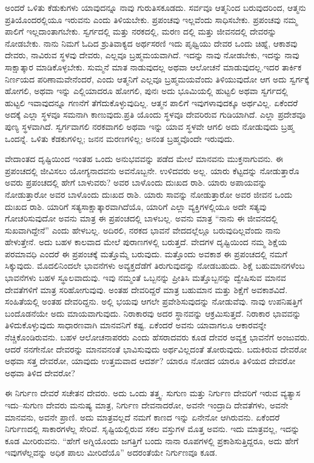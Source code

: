 ಅಂದರೆ ಒಳಿತು ಕೆಡುಕುಗಳು ಯಾವುದನ್ನೂ ನಾವು ಗುರುತಿಸಕೂಡದು. ಸರ್ವವೂ ಆತ್ಮನಿಂದ ಬರುವುದರಿಂದ, ಆತ್ಮನು ಪ್ರತಿಯೊಂದರಲ್ಲಿಯೂ ಇರುವನು ಎಂದು ತಿಳಿಯಬೇಕು. ಪ್ರಪಂಚವು ಇಲ್ಲವೆಂದು ಸಾಧಿಸಬೇಕು. ಪ್ರಪಂಚವು ನಮ್ಮ ಪಾಲಿಗೆ ಇಲ್ಲದಾಂತಾಗಬೇಕು. ಸ್ವರ್ಗದಲ್ಲಿ ಮತ್ತು ನರಕದಲ್ಲಿ, ಮರಣ ದಲ್ಲಿ ಮತ್ತು ಜೀವನದಲ್ಲಿ ದೇವರನ್ನು ನೋಡಬೇಕು. ನಾನು ನಿಮಗೆ ಓದಿದ ಶ್ರುತಿವಾಕ್ಯದ ಅರ್ಥಸರಣಿ ಇದು ಪೃಥ್ವಿಯು ದೇವರ ಒಂದು ಚಿಹ್ನೆ, ಆಕಾಶವು ದೇವರು, ನಾವಿರುವ ಸ್ಥಳವು ದೇವರು, ಎಲ್ಲವೂ ಬ್ರಹ್ಮಮಯವಾಗಿದೆ. ಇದನ್ನು ನಾವು ನೋಡಬೇಕು, ಇದನ್ನು ನಾವು ಸಾಕ್ಷಾತ್ಕಾರ ಮಾಡಿಕೊಳ್ಳಬೇಕು. ಸುಮ್ಮನೆ ಮಾತ ನಾಡುವುದಲ್ಲ ಅಥವಾ ಆಲೋಚನೆ ಮಾಡುವುದಲ್ಲ.ಇದರ ತಾರ್ಕಿಕ ನಿರ್ಣಯದ ಪರಿಣಾಮವೇನೆಂದರೆ, ಎಂದು ಆತ್ಮನಿಗೆ ಎಲ್ಲವೂ ಬ್ರಹ್ಮಮಯವೆಂದು ತಿಳಿಯುವುದೋ ಆಗ ಅದು ಸ್ವರ್ಗಕ್ಕೆ ಹೋಗಲಿ, ಅಥವಾ ಇನ್ನು ಎಲ್ಲಿಯಾದರೂ ಹೋಗಲಿ, ಪುನಃ ಅದು ಭೂಮಿಯಲ್ಲಿ ಹುಟ್ಟಲಿ ಅಥವಾ ಸ್ವರ್ಗದಲ್ಲಿ ಹುಟ್ಟಲಿ ಇವಾವುದನ್ನೂ ಗಣನೆಗೆ ತೆಗೆದುಕೊಳ್ಳುವುದಿಲ್ಲ. ಆತ್ಮನ ಪಾಲಿಗೆ ಇವುಗಳಾವುದಕ್ಕೂ ಅರ್ಥವಿಲ್ಲ. ಏಕೆಂದರೆ ಅದಕ್ಕೆ ಎಲ್ಲಾ ಸ್ಥಳವೂ ಸಮನಾಗಿ ಕಾಣುವುದು.ಪ್ರತಿ ಯೊಂದು ಸ್ಥಳವೂ ದೇವರಿರುವ ಗುಡಿಯಾಗಿದೆ. ಎಲ್ಲಾ ಪ್ರದೇಶವೂ ಪುಣ್ಯ ಸ್ಥಳವಾಗಿದೆ. ಸ್ವರ್ಗವಾಗಲಿ ನರಕವಾಗಲಿ ಅಥವಾ ಇನ್ನು ಯಾವ ಸ್ಥಳವೇ ಆಗಲಿ ಅದು ನೋಡುವುದು ಬ್ರಹ್ಮ ಒಂದನ್ನೆ. ಒಳಿತು ಕೆಡಕುಗಳಿಲ್ಲ; ಜನನ ಮರಣಗಳಿಲ್ಲ; ಅನಂತ ಬ್ರಹ್ಮವೊಂದೇ ಇರುವುದು.

ವೇದಾಂತದ ದೃಷ್ಟಿಯಿಂದ ಇಂತಹ ಒಂದು ಅನುಭವವನ್ನು ಪಡೆದ ಮೇಲೆ ಮಾನವನು ಮುಕ್ತನಾಗುವನು. ಈ ಪ್ರಪಂಚದಲ್ಲಿ ಜೀವಿಸಲು ಯೋಗ್ಯನಾದವನು ಅವನೊಬ್ಬನೇ. ಉಳಿದವರು ಅಲ್ಲ. ಯಾರು ಕೆಟ್ಟದನ್ನು ನೋಡುತ್ತಾರೊ ಅವರು ಪ್ರಪಂಚದಲ್ಲಿ ಹೇಗೆ ಬಾಳುವರು? ಅವರ ಬಾಳೊಂದು ದುಃಖದ ರಾಶಿ. ಯಾರು ಅಪಾಯವನ್ನು ನೋಡುತ್ತಾರೋ ಅವರ ಬಾಳೊಂದು ದುಃಖದ ರಾಶಿ. ಯಾರು ಸಾವನ್ನು ನೋಡುತ್ತಾರೋ ಅವರ ಜೀವನ ಒಂದು ದುಃಖದ ರಾಶಿ. ಯಾರಿಗೆ ಸತ್ಯಸಾಕ್ಷಾತ್ಕಾರವಾಗಿದೆಯೊ, ಯಾರಿಗೆ ಎಲ್ಲಾ ವ್ಯಕ್ತಿಗಳಲ್ಲಿಯೂ ಅದೇ ಸತ್ಯವು ಗೋಚರಿಸುವುದೋ ಅವನು ಮಾತ್ರ ಈ ಪ್ರಪಂಚದಲ್ಲಿ ಬಾಳಬಲ್ಲ. ಅವನು ಮಾತ್ರ “ನಾನು ಈ ಜೀವನದಲ್ಲಿ ಸುಖವಾಗಿದ್ದೇನೆ” ಎಂದು ಹೇಳಬಲ್ಲ. ಅದಿರಲಿ, ನರಕದ ಭಾವನೆ ವೇದದಲ್ಲೆಲ್ಲೂ ಬರುವುದಿಲ್ಲವೆಂದು ನಾನು ಹೇಳುತ್ತೇನೆ. ಅದು ಬಹಳ ಕಾಲವಾದ ಮೇಲೆ ಪುರಾಣಗಳಲ್ಲಿ ಬರುತ್ತದೆ. ವೇದಗಳ ದೃಷ್ಟಿಯಿಂದ ನಮ್ಮ ಶಿಕ್ಷೆಯ ಪರಮಾವಧಿ ಎಂದರೆ ಈ ಪ್ರಪಂಚಕ್ಕೆ ಮತ್ತೊಮ್ಮೆ ಬರುವುದು. ಮತ್ತೊಂದು ಅವಕಾಶ ಈ ಪ್ರಪಂಚದಲ್ಲಿ ನಮಗೆ ಸಿಕ್ಕುವುದು. ಮೊದಲಿನಿಂದಲೇ ಭಾವನೆಗಳು ಅವ್ಯಕ್ತದೆಡೆಗೆ ತಿರುಗುವುದನ್ನು ನೋಡಬಹುದು. ಶಿಕ್ಷೆ ಬಹುಮಾನಗಳೆಂಬ ಭಾವನೆಗಳು ಬಹಳ ಸ್ಥೂಲವಾದುವು. ಇವು ನಮ್ಮಂತೆ ಒಬ್ಬನನ್ನು ಪ್ರೀತಿಸಿ ಮತ್ತೊಬ್ಬನನ್ನು ದ್ವೇಷಿಸುವ ಮಾನವ ದೇವತೆಗಳಿಗೆ ಮಾತ್ರ ಸರಿಹೋಗುವುವು. ಅಂತಹ ದೇವರಿದ್ದರೆ ಮಾತ್ರ ಬಹುಮಾನ ಮತ್ತು ಶಿಕ್ಷೆಗೆ ಅವಕಾಶವಿದೆ. ಸಂಹಿತೆಯಲ್ಲಿ ಅಂತಹ ದೇವರಿದ್ದನು. ಅಲ್ಲಿ ಭಯವು ಆಗಲೇ ಪ್ರವೇಶಿಸುವುದನ್ನು ನೋಡುವೆವು. ನಾವು ಉಪನಿಷತ್ತಿಗೆ ಬಂದೊಡನೆಯೇ ಅದು ಮಾಯವಾಗುವುದು. ನಿರಾಕಾರವು ಅದರ ಸ್ಥಾನವನ್ನು ಆಕ್ರಮಿಸುತ್ತದೆ. ನಿರಾಕಾರ ಭಾವವನ್ನು ತಿಳಿದುಕೊಳ್ಳುವುದು ಸಾಧಾರಣವಾಗಿ ಮಾನವನಿಗೆ ಕಷ್ಟ. ಏಕೆಂದರೆ ಅವನು ಯಾವಾಗಲೂ ಆಕಾರವನ್ನೇ ನೆಚ್ಚಿಕೊಂಡಿರುವನು. ಬಹಳ ಆಲೋಚನಾಪರರು ಎಂದು ಹೆಸರಾದವರು ಕೂಡ ದೇವರ ಅವ್ಯಕ್ತ ಭಾವನೆಗೆ ಅಂಜುವರು. ಆದರೆ ನನಗೇನೋ ದೇವರನ್ನು ಮಾನವನಂತೆ ಭಾವಿಸುವುದು ಅರ್ಥವಿಲ್ಲದಂತೆ ತೋರುವುದು. ಬದುಕಿರುವ ದೇವರೋ ಅಥವಾ ಸತ್ತ ದೇವರೋ, ಯಾವುದು ಉತ್ತಮವಾದ ಆದರ್ಶ? ಯಾರೂ ನೋಡದ ಯಾರೂ ತಿಳಿಯದ ದೇವರೋ ಅಥವಾ ತಿಳಿದ ದೇವರೋ?

ಈ ನಿರ್ಗುಣ ದೇವರೆ ಸಚೇತನ ದೇವರು. ಅದು ಒಂದು ತತ್ತ್ವ. ಸುಗುಣ ಮತ್ತು ನಿರ್ಗುಣ ದೇವರಿಗೆ ಇರುವ ವ್ಯತ್ಯಾಸ ಇದು–ಸುಗುಣ ದೇವರು ಮನುಷ್ಯ ಮಾತ್ರ, ನಿರ್ಗುಣ ದೇವನಾದರೋ, ಅವನೇ ಇಂದ್ರಾದಿ ದೇವತೆಗಳು, ಅವನೇ ಮಾನವನು, ಅವನೇ ಪ್ರಾಣಿ. ಅದು ಮಾತ್ರವಲ್ಲದೆ ನಮಗೆ ಕಾಣದ ಇನ್ನು ಏನೇನೋ ಆಗಿರುವನು. ಏಕೆಂದರೆ ನಿರ್ಗುಣದಲ್ಲಿ ಸಾಕಾರಗಳೆಲ್ಲ ಸೇರಿವೆ. ಸೃಷ್ಟಿಯಲ್ಲಿರುವ ಸಕಲ ವಸ್ತುಗಳ ಮೊತ್ತ ಅವನು. ಇದು ಮಾತ್ರವಲ್ಲ, ಇದನ್ನು ಕೂಡ ಮೀರಿರುವನು. “ಹೇಗೆ ಅಗ್ನಿಯೊಂದು ಜಗತ್ತಿಗೆ ಬಂದು ನಾನಾ ರೂಪಗಳಲ್ಲಿ ಪ್ರಕಾಶಿಸುತ್ತಿದ್ದರೂ, ಅದು ಹೇಗೆ ಇವುಗಳೆಲ್ಲವನ್ನು ಅಧಿಕ ಪಾಲು ಮೀರಿದೆಯೊ” ಅದರಂತೆಯೇ ನಿರ್ಗುಣವೂ ಕೂಡ.

